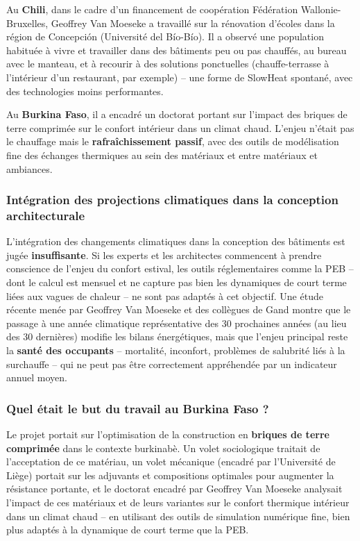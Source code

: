Au \textbf{Chili}, dans le cadre d'un financement de coopération Fédération Wallonie-Bruxelles, Geoffrey Van Moeseke a travaillé sur la rénovation d'écoles dans la région de Concepción (Université del Bío-Bío). Il a observé une population habituée à vivre et travailler dans des bâtiments peu ou pas chauffés, au bureau avec le manteau, et à recourir à des solutions ponctuelles (chauffe-terrasse à l'intérieur d'un restaurant, par exemple) -- une forme de SlowHeat spontané, avec des technologies moins performantes.

Au \textbf{Burkina Faso}, il a encadré un doctorat portant sur l'impact des briques de terre comprimée sur le confort intérieur dans un climat chaud. L'enjeu n'était pas le chauffage mais le \textbf{rafraîchissement passif}, avec des outils de modélisation fine des échanges thermiques au sein des matériaux et entre matériaux et ambiances.

\subsubsection{Intégration des projections climatiques dans la conception architecturale}

L'intégration des changements climatiques dans la conception des bâtiments est jugée \textbf{insuffisante}. Si les experts et les architectes commencent à prendre conscience de l'enjeu du confort estival, les outils réglementaires comme la PEB -- dont le calcul est mensuel et ne capture pas bien les dynamiques de court terme liées aux vagues de chaleur -- ne sont pas adaptés à cet objectif. Une étude récente menée par Geoffrey Van Moeseke et des collègues de Gand montre que le passage à une année climatique représentative des 30 prochaines années (au lieu des 30 dernières) modifie les bilans énergétiques, mais que l'enjeu principal reste la \textbf{santé des occupants} -- mortalité, inconfort, problèmes de salubrité liés à la surchauffe -- qui ne peut pas être correctement appréhendée par un indicateur annuel moyen.

\subsubsection{Quel était le but du travail au Burkina Faso ?}

Le projet portait sur l'optimisation de la construction en \textbf{briques de terre comprimée} dans le contexte burkinabè. Un volet sociologique traitait de l'acceptation de ce matériau, un volet mécanique (encadré par l'Université de Liège) portait sur les adjuvants et compositions optimales pour augmenter la résistance portante, et le doctorat encadré par Geoffrey Van Moeseke analysait l'impact de ces matériaux et de leurs variantes sur le confort thermique intérieur dans un climat chaud -- en utilisant des outils de simulation numérique fine, bien plus adaptés à la dynamique de court terme que la PEB.

